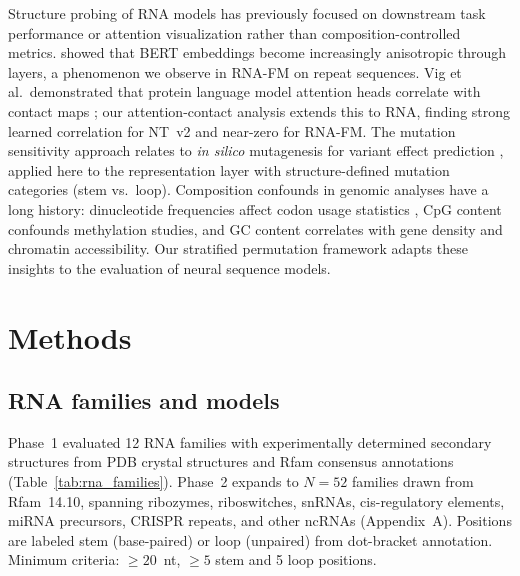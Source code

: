 \documentclass[11pt]{article}
\begin{document}
Structure probing of RNA models has previously focused on
downstream task performance \citep{rnafm,dalla2023nucleotide} or
attention visualization rather than composition-controlled metrics.
\citet{ethayarajh2019} showed that BERT embeddings become increasingly
anisotropic through layers, a phenomenon we observe in RNA-FM on
repeat sequences.  Vig et al.\ demonstrated that protein language
model attention heads correlate with contact maps
\citep{vig2020bertology}; our attention-contact analysis extends this
to RNA, finding strong learned correlation for NT~v2 and near-zero
for RNA-FM.  The mutation sensitivity approach relates to \emph{in
silico} mutagenesis for variant effect prediction
\citep{frazer2021disease}, applied here to the representation layer
with structure-defined mutation categories (stem vs.\ loop).
Composition confounds in genomic analyses have a long history:
dinucleotide frequencies affect codon usage statistics
\citep{karlin1998dinucleotide}, CpG content confounds methylation
studies, and GC content correlates with gene density and chromatin
accessibility.  Our stratified permutation framework adapts these
insights to the evaluation of neural sequence models.


\section{Methods}
\label{sec:methods}

\subsection{RNA families and models}
\label{sec:families_models}

Phase~1 evaluated 12 RNA families with experimentally determined
secondary structures from PDB crystal structures and Rfam consensus
annotations (Table~\ref{tab:rna_families}).  Phase~2 expands to
$N = 52$ families drawn from Rfam~14.10, spanning ribozymes,
riboswitches, snRNAs, cis-regulatory elements, miRNA precursors,
CRISPR repeats, and other ncRNAs (Appendix~A).  Positions are labeled
stem (base-paired) or loop (unpaired) from dot-bracket annotation.
Minimum criteria: $\geq 20$~nt, $\geq 5$ stem and 5 loop positions.
\end{document}
